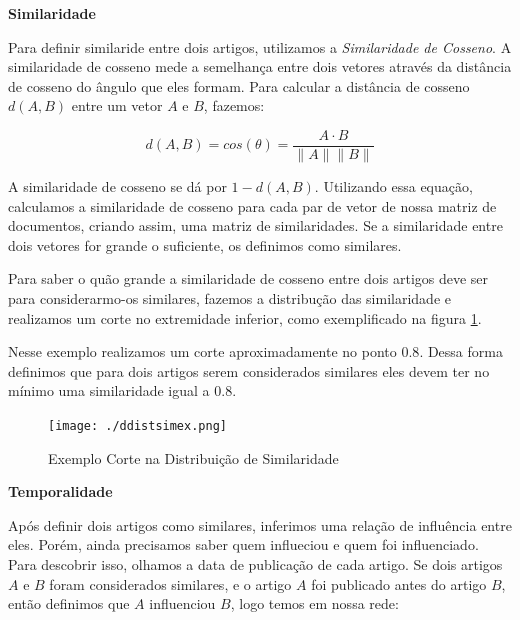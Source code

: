 \documentclass[a4paper,12pt]{article}
\begin{document}
 \begin{description}
  \item \textbf{Similaridade}
  
    Para definir similaride entre dois artigos, utilizamos a \textit{Similaridade de Cosseno}. A similaridade de cosseno mede a semelhança entre
    dois vetores através da distância de cosseno do ângulo que eles formam. Para calcular a distância de cosseno $d(A,B)$ entre um vetor $A$ e $B$, fazemos:
    
    \begin{equation}
      d(A,B) = cos(\theta) = \dfrac{A \cdot B}{\parallel A\parallel \parallel B \parallel}
    \end{equation}

    
    A similaridade de cosseno se dá por $1-d(A,B)$. Utilizando essa equação, calculamos a similaridade de cosseno para cada
    par de vetor de nossa matriz de documentos, criando assim, uma matriz de similaridades. Se a similaridade entre dois vetores for 
    grande o suficiente, os definimos como similares. 
    
    Para saber o quão grande a similaridade de cosseno entre dois artigos deve ser para considerarmo-os similares, fazemos a
    distribução das similaridade e realizamos um corte no extremidade inferior, como exemplificado na figura \ref{fig:2}.
    
    Nesse
    exemplo realizamos um corte aproximadamente no ponto $0.8$. Dessa forma definimos que para dois artigos serem considerados similares
    eles devem ter no mínimo uma similaridade igual a $0.8$.

    
    \pagebreak
    \begin{figure}[ht]
      \label{fig:2}
      \centering
      \texttt{[image: ./ddistsimex.png]}
      \caption{Exemplo Corte na Distribuição de Similaridade}
    \end{figure}

    
  \item \textbf{Temporalidade}
  
    Após definir dois artigos como similares, inferimos uma relação de influência entre eles. Porém, ainda precisamos saber quem influeciou e quem
    foi influenciado. Para descobrir isso, olhamos a data de publicação de cada artigo. Se dois artigos $A$ e $B$ foram considerados 
    similares, e o artigo $A$ foi publicado antes do artigo $B$, então definimos que $A$ influenciou $B$, logo temos em nossa rede:
    

\end{description}
\end{document}
